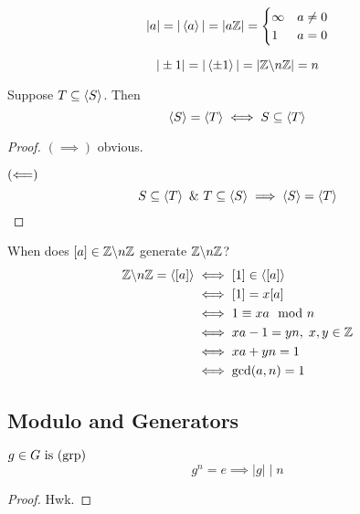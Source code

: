 \documentclass[12pt]{article}
\newcommand{\order}[1]{\left\lvert#1\right\rvert}
\newcommand{\divides}{\mathbin|}
\begin{document}
\bboxexam
\begin{exam}[Integers]\
  \[
    |a|=|\left\langle a\right\rangle|=|a\mathbb Z|=
    \begin{cases}
      \infty&a\neq0\\
      1&a=0
    \end{cases}
  \]
\end{exam}
\ebox

\bboxexam
\begin{exam}
  \[
    |\pm1|=|\left\langle \pm1\right\rangle|
    =|\mathbb Z\backslash n\mathbb Z|=n
  \]
\end{exam}
\ebox

\bboxlem
\begin{lem}
  Suppose \(T\subseteq\left\langle S\right\rangle\). Then
  \[\left\langle S\right\rangle=\left\langle T\right\rangle\iff S\subseteq\left\langle T\right\rangle\]
\end{lem}
\ebox

\bboxproof
\begin{proof}[Proof]
  \((\implies)\) obvious.

  \((\Longleftarrow)\)
  \[S\subseteq\gen{T}\ \&\ T\subseteq\gen{S}\implies\gen{S}=\gen{T}\]
\end{proof}
\ebox


\bboxexam
\begin{exam}
  When does \([a]\in\mathbb Z\backslash n\mathbb Z\) generate \(\mathbb Z\backslash n\mathbb Z\)?
  \begin{align*}
    \mathbb Z\backslash n\mathbb Z=\left\langle [a]\right\rangle&\iff[1]\in\left\langle [a]\right\rangle\\
                              &\iff[1]=x[a]\\
                              &\iff1\equiv xa\mod n\\
                              &\iff xa-1=yn,\;x,y\in\mathbb Z\\
                              &\iff xa+yn=1\\
                              &\iff\gcd(a,n)=1
  \end{align*}
\end{exam}
\ebox

\subsection{Modulo and Generators}


\bboxlem
\begin{lem}
    \(g\in G\ \mathrm{is}\ (\mathrm{grp})\)
    \[
        g^n=e\implies\order{g}\divides n
    \]
\end{lem}
\ebox

\bboxproof
\begin{proof}
    Hwk.
\end{proof}
\ebox
\end{document}
